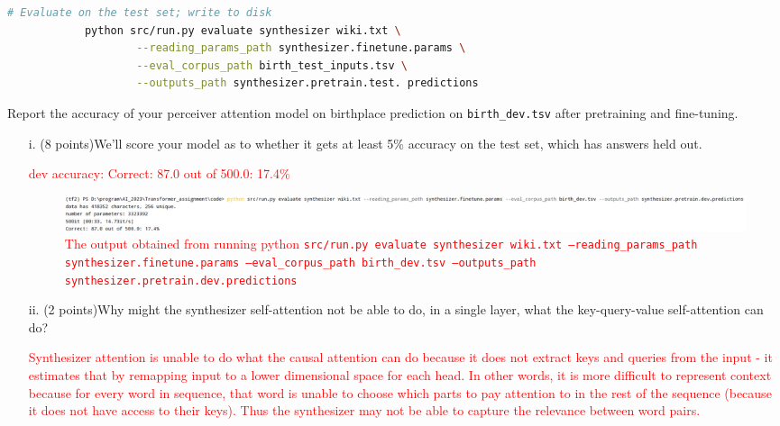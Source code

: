 \documentclass[letterpaper,12pt]{article}
\begin{document}
\begin{itemize}
\begin{lstlisting}[basicstyle=\ttfamily, language=bash]
			# Evaluate on the test set; write to disk
			python src/run.py evaluate synthesizer wiki.txt \
					--reading_params_path synthesizer.finetune.params \
					--eval_corpus_path birth_test_inputs.tsv \
					--outputs_path synthesizer.pretrain.test. predictions
		\end{lstlisting}
		
		Report the accuracy of your perceiver attention model on birthplace prediction on \texttt{birth\_dev.tsv} after pretraining and fine-tuning.
		\begin{itemize}
		\item[i.]
			(8 points)We'll score your model as to whether it gets at least 5\% accuracy on the test set, which has answers held out.
			
			\textcolor{red}{ dev accuracy: Correct: 87.0 out of 500.0: 17.4\%
			\begin{figure}[htbp] 
				\centering 
				\includegraphics[width=\linewidth]{picture/2.g.result}
				\captionsetup{font=small}
				\caption{
					\label{fig: 2.g.result} %
					The output obtained from running python \texttt{src/run.py evaluate synthesizer wiki.txt --reading\_params\_path synthesizer.finetune.params --eval\_corpus\_path birth\_dev.tsv --outputs\_path synthesizer.pretrain.dev.predictions
					}
				}
			\end{figure}
			}
			
			
		\item[ii.]
			(2 points)Why might the synthesizer self-attention not be able to do, in a single layer, what the key-query-value self-attention can do?
			
			\textcolor{red}{ Synthesizer attention is unable to do what the causal attention can do because it does not extract keys and queries from the input - it estimates that by remapping input to a lower dimensional space for each head. In other words, it is more difficult to represent context because for every word in sequence, that word is unable to choose which parts to pay attention to in the rest of the sequence (because it does not have access to their keys). Thus the synthesizer may not be able to capture the relevance between word pairs.}
			
		\end{itemize}
		
	\end{itemize}
	
\end{document}
